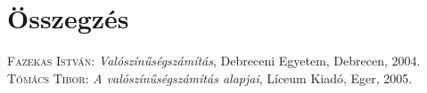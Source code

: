 \documentclass[]{thesis-ekf}
\theoremstyle{definition}
\theoremstyle{remark}
\begin{document}
\chapter*{Összegzés}

\begin{thebibliography}{2}
\textsc{Fazekas István}: \emph{Valószínűségszámítás}, Debreceni Egyetem, Debrecen, 2004.
\textsc{Tómács Tibor}: \emph{A valószínűségszámítás alapjai}, Líceum Kiadó, Eger, 2005.
\end{thebibliography}


\end{document}
